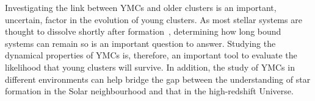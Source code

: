 Investigating the link between YMCs and older clusters is an important, uncertain, factor in the evolution of young clusters.
As most stellar systems are thought to dissolve shortly after formation~\citep{2003ARA&A..41...57L}, determining how long bound systems can remain so is an important question to answer.
Studying the dynamical properties of YMCs is, therefore, an important tool to evaluate the likelihood that young clusters will survive.
In addition, the study of YMCs in different environments can help bridge the gap between the understanding of star formation in the Solar neighbourhood and that in the high-redshift Universe.






